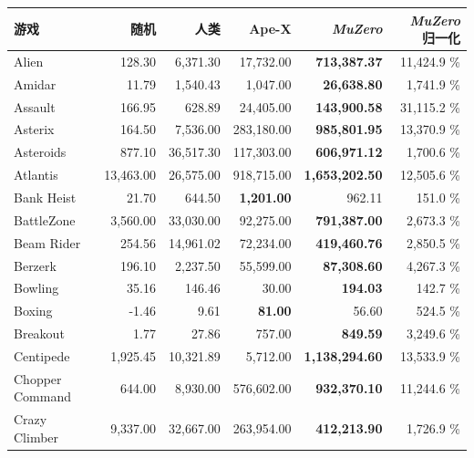 \documentclass{article}
\newcommand{\muzero}{\emph{MuZero}}
\begin{document}
\begin{table}
\caption{\label{tab:atari-results-at30}
\textbf{\muzero{} 在 Atari 单个游戏上的评估结果，采用 30 次随机 no-op 启动。} 每个游戏的最佳结果用\textbf{粗体}标出。每个 episode 最长限制为 30 分钟游戏时间（108k 帧）。SimPLe 只在 57 个游戏中的 36 个上评估，缺失结果以“-”表示。人类归一化分数计算为 $s_{normalized} = \frac{s_{agent} - s_{random}}{s_{human} - s_{random}}$。}
\end{table}

\begin{table}
\scriptsize

\begin{center}\begin{tabularx}{0.750000\textwidth}{X| r r r r r}
\toprule
游戏&随机&人类&Ape-X\cite{apex} & \muzero{} & \muzero{} 归一化\\
\midrule
Alien&128.30 & 6,371.30 & 17,732.00 & \textbf{713,387.37} & 11,424.9 \%\\
Amidar&11.79 & 1,540.43 & 1,047.00 & \textbf{26,638.80} & 1,741.9 \%\\
Assault&166.95 & 628.89 & 24,405.00 & \textbf{143,900.58} & 31,115.2 \%\\
Asterix&164.50 & 7,536.00 & 283,180.00 & \textbf{985,801.95} & 13,370.9 \%\\
Asteroids&877.10 & 36,517.30 & 117,303.00 & \textbf{606,971.12} & 1,700.6 \%\\
Atlantis&13,463.00 & 26,575.00 & 918,715.00 & \textbf{1,653,202.50} & 12,505.6 \%\\
Bank Heist&21.70 & 644.50 & \textbf{1,201.00} & 962.11 & 151.0 \%\\
BattleZone&3,560.00 & 33,030.00 & 92,275.00 & \textbf{791,387.00} & 2,673.3 \%\\
Beam Rider&254.56 & 14,961.02 & 72,234.00 & \textbf{419,460.76} & 2,850.5 \%\\
Berzerk&196.10 & 2,237.50 & 55,599.00 & \textbf{87,308.60} & 4,267.3 \%\\
Bowling&35.16 & 146.46 & 30.00 & \textbf{194.03} & 142.7 \%\\
Boxing&-1.46 & 9.61 & \textbf{81.00} & 56.60 & 524.5 \%\\
Breakout&1.77 & 27.86 & 757.00 & \textbf{849.59} & 3,249.6 \%\\
Centipede&1,925.45 & 10,321.89 & 5,712.00 & \textbf{1,138,294.60} & 13,533.9 \%\\
Chopper Command&644.00 & 8,930.00 & 576,602.00 & \textbf{932,370.10} & 11,244.6 \%\\
Crazy Climber&9,337.00 & 32,667.00 & 263,954.00 & \textbf{412,213.90} & 1,726.9 \%\\

\end{tabularx}
\end{center}
\end{table}
\end{document}
